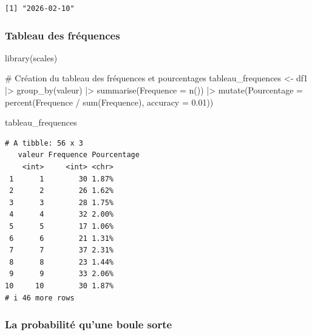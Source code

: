 \documentclass{article}
\newenvironment{Shaded}{\begin{snugshade}}{\end{snugshade}}
\newcommand{\AttributeTok}[1]{\textcolor[rgb]{0.40,0.45,0.13}{#1}}
\newcommand{\CommentTok}[1]{\textcolor[rgb]{0.37,0.37,0.37}{#1}}
\newcommand{\FloatTok}[1]{\textcolor[rgb]{0.68,0.00,0.00}{#1}}
\newcommand{\FunctionTok}[1]{\textcolor[rgb]{0.28,0.35,0.67}{#1}}
\newcommand{\NormalTok}[1]{\textcolor[rgb]{0.00,0.23,0.31}{#1}}
\newcommand{\OtherTok}[1]{\textcolor[rgb]{0.00,0.23,0.31}{#1}}
\newcommand{\SpecialCharTok}[1]{\textcolor[rgb]{0.37,0.37,0.37}{#1}}
\begin{document}
\begin{Shaded}
\end{Shaded}

\begin{verbatim}
[1] "2026-02-10"
\end{verbatim}

\subsubsection{Tableau des fréquences}\label{tableau-des-fruxe9quences}

\begin{Shaded}
\begin{Highlighting}[]
\FunctionTok{library}\NormalTok{(scales)}

\CommentTok{\# Création du tableau des fréquences et pourcentages}
\NormalTok{tableau\_frequences }\OtherTok{\textless{}{-}}\NormalTok{ df1 }\SpecialCharTok{|\textgreater{}} \FunctionTok{group\_by}\NormalTok{(valeur) }\SpecialCharTok{|\textgreater{}} 
  \FunctionTok{summarise}\NormalTok{(}\AttributeTok{Frequence =} \FunctionTok{n}\NormalTok{()) }\SpecialCharTok{|\textgreater{}} 
  \FunctionTok{mutate}\NormalTok{(}\AttributeTok{Pourcentage =} \FunctionTok{percent}\NormalTok{(Frequence }\SpecialCharTok{/} \FunctionTok{sum}\NormalTok{(Frequence), }\AttributeTok{accuracy =} \FloatTok{0.01}\NormalTok{))}

\NormalTok{tableau\_frequences}
\end{Highlighting}
\end{Shaded}

\begin{verbatim}
# A tibble: 56 x 3
   valeur Frequence Pourcentage
    <int>     <int> <chr>      
 1      1        30 1.87%      
 2      2        26 1.62%      
 3      3        28 1.75%      
 4      4        32 2.00%      
 5      5        17 1.06%      
 6      6        21 1.31%      
 7      7        37 2.31%      
 8      8        23 1.44%      
 9      9        33 2.06%      
10     10        30 1.87%      
# i 46 more rows
\end{verbatim}

\subsubsection{La probabilité qu'une boule
sorte}\label{la-probabilituxe9-quune-boule-sorte}
\end{document}
